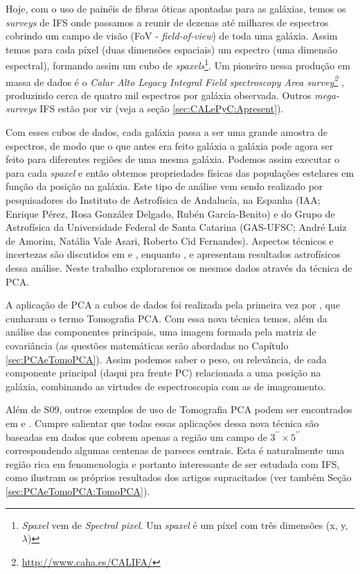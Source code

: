 Hoje, com o uso de painéis de fibras óticas apontadas para as galáxias, temos os {\em surveys} de IFS onde passamos a
reunir de dezenas até milhares de espectros cobrindo um campo de visão (FoV - {\em field-of-view}) de toda uma galáxia.
Assim temos para cada píxel (duas dimensões espaciais) um espectro (uma dimensão espectral), formando assim um cubo de
{\em spaxels}\footnote{{\em Spaxel} vem de {\em Spectral pixel}. Um {\em spaxel} é um píxel com três dimensões (x, y,
$\lambda$)}. Um pioneiro nessa produção em massa de dados é o {\em Calar Alto Legacy Integral Field spectroscopy Area
survey\footnote{\url{http://www.caha.es/CALIFA/}}} \citep[CALIFA; ][]{CALIFAPresent2012}, produzindo cerca de quatro mil
espectros por galáxia observada. Outros {\em mega-surveys} IFS estão por vir (veja a seção \ref{sec:CALePyC:Apresent}).

Com esses cubos de dados, cada galáxia passa a ser uma grande amostra de espectros, de modo que o que antes era feito
galáxia a galáxia pode agora ser feito para diferentes regiões de uma mesma galáxia. Podemos assim executar o \starlight
para cada {\em spaxel} e então obtemos propriedades físicas das populações estelares em função da posição na galáxia.
Este tipo de análise vem sendo realizado por pesquisadores do Instituto de Astrofísica de Andalucía, na Espanha (IAA;
Enrique Pérez, Rosa González Delgado, Rubén García-Benito) e do Grupo de Astrofísica da Universidade Federal de Santa
Catarina (GAS-UFSC; André Luiz de Amorim, Natália Vale Asari, Roberto Cid Fernandes). Aspectos técnicos e incertezas são
discutidos em \citet[][CF13 daqui pra frente]{CidFernandes2013} e \citet{CidFernandes2014}, enquanto \citet{Perez2013},
e \citet{GonzalezDelgado2014} apresentam resultados astrofísicos dessa análise. Neste trabalho explorarenos os mesmos
dados através da técnica de PCA.

A aplicação de PCA a cubos de dados foi realizada pela primeira vez por \citet[][S09 daqui pra frente]{Steiner2009}, que
cunharam o termo Tomografia PCA. Com essa nova técnica temos, além da análise das componentes principais, uma imagem
formada pela matriz de covariância (as questões matemáticas serão abordadas no Capítulo \ref{sec:PCAeTomoPCA}). Assim
podemos saber o peso, ou relevância, de cada componente principal (daqui pra frente PC) relacionada a uma posição na
galáxia, combinando as virtudes de espectroscopia com as de imageamento.

Além de S09, outros exemplos de uso de Tomografia PCA podem ser encontrados em \citet{Riffel2011} e \citet{Ricci2011}.
Cumpre salientar que todas essas aplicações dessa nova técnica são baseadas em dados que cobrem apenas a região um campo
de $3^{\prime\prime} \times 5^{\prime\prime}$ correspondendo algumas centenas de parsecs centrais. Esta é naturalmente
uma região rica em fenomenologia e portanto interessante de ser estudada com IFS, como ilustram os próprios resultados
dos artigos supracitados (ver também Seção \ref{sec:PCAeTomoPCA:TomoPCA}).

